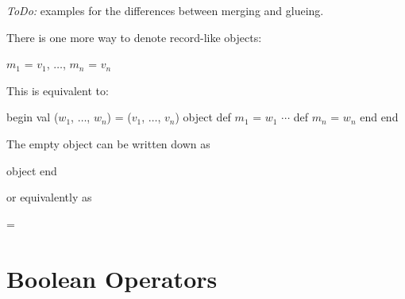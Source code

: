 \documentclass[11pt]{amsart}
\begin{document}
\emph{ToDo:} examples for the differences between merging and glueing.

\noindent There is one more way to denote record-like objects:
\begin{babellisting}
{ $m_1$ = $v_1$, $\ldots$, $m_n$ = $v_n$ }
\end{babellisting}
This is equivalent to:
\begin{babellisting}
begin
  val ($w_1$, $\ldots$, $w_n$) = ($v_1$, $\ldots$, $v_n$)
  object
    def $m_1$ = $w_1$
    $\cdots$
    def $m_n$ = $w_n$
  end
end
\end{babellisting}
The empty object can be written down as
\begin{babellisting}
object end
\end{babellisting}
or equivalently as
\begin{babellisting}
{ = }
\end{babellisting}


\section{Boolean Operators}
\end{document}
